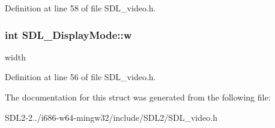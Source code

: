 Definition at line 58 of file S\+D\+L\+\_\+video.\+h.

\hypertarget{structSDL__DisplayMode_a504bb5e21950b719a0df43be51199046}{
\subsubsection[{w}]{\setlength{\rightskip}{0pt plus 5cm}int S\+D\+L\+\_\+\+Display\+Mode\+::w}}\label{structSDL__DisplayMode_a504bb5e21950b719a0df43be51199046}
width 

Definition at line 56 of file S\+D\+L\+\_\+video.\+h.



The documentation for this struct was generated from the following file\+:\begin{DoxyCompactItemize}
\item 
S\+D\+L2-\/2../i686-\/w64-\/mingw32/include/\+S\+D\+L2/S\+D\+L\+\_\+video.\+h\end{DoxyCompactItemize}
